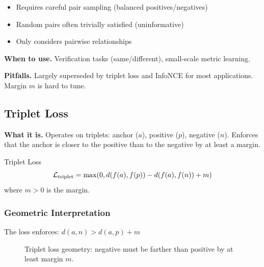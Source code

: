 \begin{itemize}
    \item Requires careful pair sampling (balanced positives/negatives)
    \item Random pairs often trivially satisfied (uninformative)
    \item Only considers pairwise relationships
\end{itemize}

\textbf{When to use.} Verification tasks (same/different), small-scale metric learning.

\textbf{Pitfalls.} Largely superseded by triplet loss and InfoNCE for most applications. Margin $m$ is hard to tune.

\subsection{Triplet Loss}

\textbf{What it is.} Operates on triplets: anchor ($a$), positive ($p$), negative ($n$). Enforces that the anchor is closer to the positive than to the negative by at least a margin.

\begin{mathresult}{Triplet Loss}
\begin{equation}
\mathcal{L}_{\text{triplet}} = \max(0, d(f(a), f(p)) - d(f(a), f(n)) + m)
\end{equation}
where $m > 0$ is the margin.
\end{mathresult}

\subsubsection{Geometric Interpretation}

The loss enforces: $d(a, n) > d(a, p) + m$

\begin{figure}[H]
\centering
{}
\caption{Triplet loss geometry: negative must be farther than positive by at least margin $m$.}
\end{figure}

